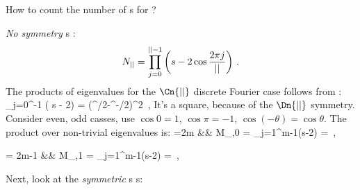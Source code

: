 How to count the number of {\lattstate}s for \templatt?

\emph{No symmetry} {\lattstate}s \HillDet:
\[
N_{||} = \prod_{j=0}^{{||}-1} \left( s - 2\cos\frac{2\pi j}{{||}}\right)
\,.
\]
The products of eigenvalues for the $\Cn{\cl{}}$ discrete Fourier
case follows from :
\beq
\prod_{j=0}^{\cl{}-1} \left( s - 2\cos{}\right)
= (\ExpaEig^{\cl{}/2}-\ExpaEig^{-\cl{}/2})^2
\,,
It's a square, because of the  $\Dn{\cl{}}$ symmetry.
Consider even, odd casses, use $\cos0=1$, $\cos\pi=-1$,
$\cos(-\theta)=\cos\theta$. The product over non-trivial eigenvalues is:
\bea
\cl{}=2m
     &&
M_{\cl{},0} =
 \prod_{j=1}^{m-1}\left({s}-2\cos{}\right)
      =  
              {{\mu}}
\,,
\label{LC21:eigsProdEven}
\eea

\bea
\cl{}= 2m-1
     &&
M_{\cl{},1} =
 \prod_{j=1}^{m-1}\left({s}-2\cos{}\right)
     = 
              {{\mu}}
\,,
\label{LC21:eigsProdOdd}
\eea

Next, look at the \emph{symmetric} {\lattstate}s {\HillDet}s:

